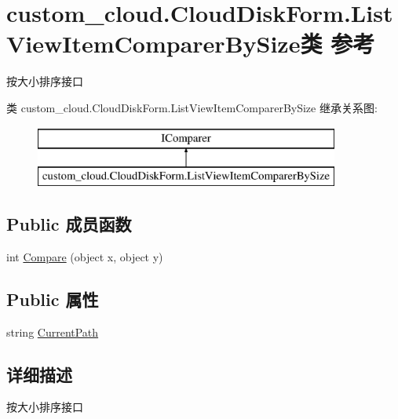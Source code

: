 \hypertarget{classcustom__cloud_1_1_cloud_disk_form_1_1_list_view_item_comparer_by_size}{}\section{custom\+\_\+cloud.\+Cloud\+Disk\+Form.\+List\+View\+Item\+Comparer\+By\+Size类 参考}
\label{classcustom__cloud_1_1_cloud_disk_form_1_1_list_view_item_comparer_by_size}


按大小排序接口  


类 custom\+\_\+cloud.\+Cloud\+Disk\+Form.\+List\+View\+Item\+Comparer\+By\+Size 继承关系图\+:\begin{figure}[H]
\begin{center}
\leavevmode
\includegraphics[height=2.000000cm]{classcustom__cloud_1_1_cloud_disk_form_1_1_list_view_item_comparer_by_size}
\end{center}
\end{figure}
\subsection*{Public 成员函数}
\begin{DoxyCompactItemize}
\item 
int \hyperlink{classcustom__cloud_1_1_cloud_disk_form_1_1_list_view_item_comparer_by_size_a464d0c92e22debfec20e51897119b48e}{Compare} (object x, object y)
\end{DoxyCompactItemize}
\subsection*{Public 属性}
\begin{DoxyCompactItemize}
\item 
string \hyperlink{classcustom__cloud_1_1_cloud_disk_form_1_1_list_view_item_comparer_by_size_a37bb388d42c34cbf6763c0b9565a6612}{Current\+Path}
\end{DoxyCompactItemize}


\subsection{详细描述}
按大小排序接口 



